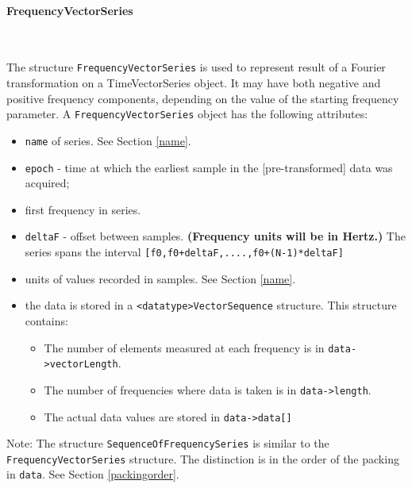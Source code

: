 \documentclass[]{ligodcc}
\renewcommand{\texttt}[1]{{\ttfamily\color{blue}#1}}
\begin{document}
\paragraph{{\texttt {FrequencyVectorSeries}} }~



The structure {\tt FrequencyVectorSeries} is used to represent result of a
Fourier transformation on a TimeVectorSeries object. It may have both
negative and positive frequency components, depending on the value
of the starting frequency parameter. A {\tt FrequencyVectorSeries} object
has the following attributes:


\begin{itemize}
\vspace{-0.15in}
\item
{\tt name} of series. See Section \ref{name}.
\vspace{-0.15in}
\item
{\tt epoch}  -  time at which the earliest sample in the [pre-transformed]
data was acquired;
\vspace{-0.15in}
\item
first frequency in series.
\vspace{-0.15in}
\item
{\tt deltaF}  -  offset between samples.  {\bf (Frequency units will be in Hertz.)}
The series spans the interval {\tt [f0,f0+deltaF,....,f0+(N-1)*deltaF]}
\vspace{-0.15in}
\item
units of values recorded in samples. See Section \ref{name}.
\vspace{-0.15in}
\item
the data is stored in a {\tt <datatype>VectorSequence}
structure. This structure contains:
\begin{itemize}
\vspace{-0.10in}
\item
The number of elements measured at each frequency is in {\tt data->vectorLength}.
\vspace{-0.10in}
\item
The number of frequencies where  data is taken is in {\tt data->length}.
\vspace{-0.10in}
\item
The actual data  values are stored in {\tt data->data[]}
\end{itemize}
\end{itemize}

Note: The structure {\tt SequenceOfFrequencySeries} is similar to the
{\tt FrequencyVectorSeries} structure. The distinction is in the order of
the packing in {\tt *data}. See Section \ref{packingorder}.
\end{document}
